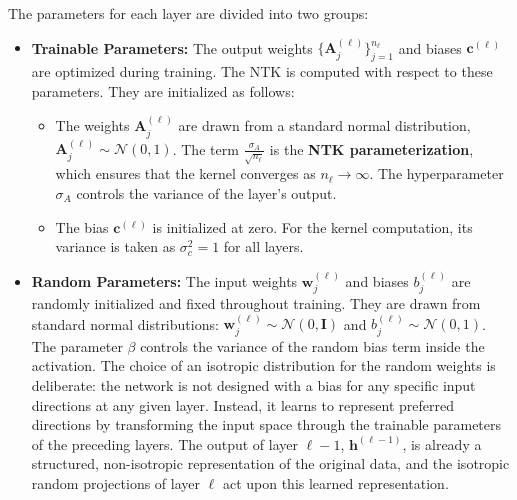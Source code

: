 \documentclass[12pt]{article}
\begin{document}
The parameters for each layer are divided into two groups:
\begin{itemize}
    \item \textbf{Trainable Parameters:} The output weights $\{\bm{A}_j^{(\ell)}\}_{j=1}^{n_\ell}$ and biases $\bm{c}^{(\ell)}$ are optimized during training. The NTK is computed with respect to these parameters. They are initialized as follows:
    \begin{itemize}
        \item The weights $\bm{A}_j^{(\ell)}$ are drawn from a standard normal distribution, $\bm{A}_j^{(\ell)} \sim \mathcal{N}(0, 1)$. The term $\frac{\sigma_A}{\sqrt{n_\ell}}$ is the \textbf{NTK parameterization}, which ensures that the kernel converges as $n_\ell \to \infty$. The hyperparameter $\sigma_A$ controls the variance of the layer's output.
        \item The bias $\bm{c}^{(\ell)}$ is initialized at zero. For the kernel computation, its variance is taken as $\sigma_c^2 = 1$ for all layers.
    \end{itemize}
    \item \textbf{Random Parameters:} The input weights $\bm{w}_j^{(\ell)}$ and biases $b_j^{(\ell)}$ are randomly initialized and fixed throughout training. They are drawn from standard normal distributions: $\bm{w}_j^{(\ell)} \sim \mathcal{N}(0, \mathbf{I})$ and $b_j^{(\ell)} \sim \mathcal{N}(0, 1)$. The parameter $\beta$ controls the variance of the random bias term inside the activation. The choice of an isotropic distribution for the random weights is deliberate: the network is not designed with a bias for any specific input directions at any given layer. Instead, it learns to represent preferred directions by transforming the input space through the trainable parameters of the preceding layers. The output of layer $\ell-1$, $\bm{h}^{(\ell-1)}$, is already a structured, non-isotropic representation of the original data, and the isotropic random projections of layer $\ell$ act upon this learned representation.
\end{itemize}
\end{document}
